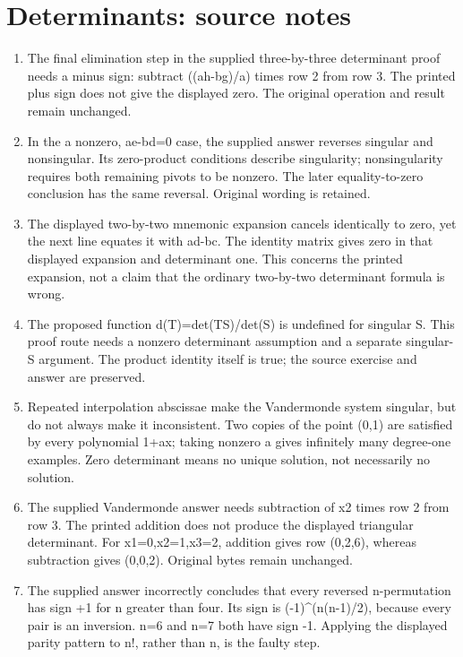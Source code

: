 \section*{Determinants: source notes}
\begin{enumerate}
\item The final elimination step in the supplied three-by-three determinant proof needs a minus sign: subtract ((ah-bg)/a) times row 2 from row 3. The printed plus sign does not give the displayed zero. The original operation and result remain unchanged.
\item In the a nonzero, ae-bd=0 case, the supplied answer reverses singular and nonsingular. Its zero-product conditions describe singularity; nonsingularity requires both remaining pivots to be nonzero. The later equality-to-zero conclusion has the same reversal. Original wording is retained.
\item The displayed two-by-two mnemonic expansion cancels identically to zero, yet the next line equates it with ad-bc. The identity matrix gives zero in that displayed expansion and determinant one. This concerns the printed expansion, not a claim that the ordinary two-by-two determinant formula is wrong.
\item The proposed function d(T)=det(TS)/det(S) is undefined for singular S. This proof route needs a nonzero determinant assumption and a separate singular-S argument. The product identity itself is true; the source exercise and answer are preserved.
\item Repeated interpolation abscissae make the Vandermonde system singular, but do not always make it inconsistent. Two copies of the point (0,1) are satisfied by every polynomial 1+ax; taking nonzero a gives infinitely many degree-one examples. Zero determinant means no unique solution, not necessarily no solution.
\item The supplied Vandermonde answer needs subtraction of x2 times row 2 from row 3. The printed addition does not produce the displayed triangular determinant. For x1=0,x2=1,x3=2, addition gives row (0,2,6), whereas subtraction gives (0,0,2). Original bytes remain unchanged.
\item The supplied answer incorrectly concludes that every reversed n-permutation has sign +1 for n greater than four. Its sign is (-1)\textasciicircum{}(n(n-1)/2), because every pair is an inversion. n=6 and n=7 both have sign -1. Applying the displayed parity pattern to n!, rather than n, is the faulty step.
\end{enumerate}

